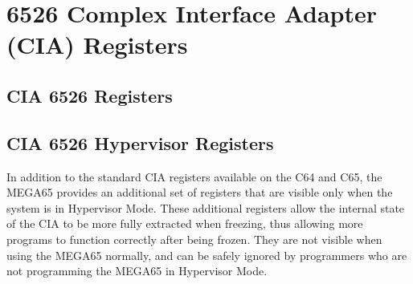 \chapter{6526 Complex Interface Adapter (CIA) Registers}

\section{CIA 6526 Registers}




\section{CIA 6526 Hypervisor Registers}

In addition to the standard CIA registers available on the C64 and C65, the MEGA65
provides an additional set of registers that are visible only when the system is in
Hypervisor Mode. These additional registers allow the internal state of the CIA to
be more fully extracted when freezing, thus allowing more programs to function
correctly after being frozen.  They are not visible when using the MEGA65 normally,
and can be safely ignored by programmers who are not programming the MEGA65 in
Hypervisor Mode.




